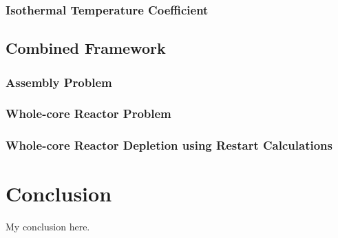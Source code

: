 \documentclass[11pt,a4paper,onecolumn,oneside]{report}
\begin{document}
\subsubsection{Isothermal Temperature Coefficient}

\subsection{Combined Framework}
\subsubsection{Assembly Problem}
\subsubsection{Whole-core Reactor Problem}
\subsubsection{Whole-core Reactor Depletion using Restart Calculations}


\newpage 
\section{Conclusion} 
My conclusion here.

\clearpage



\clearpage




\hbox{ }
\thispagestyle{empty}
\clearpage
\end{document}
